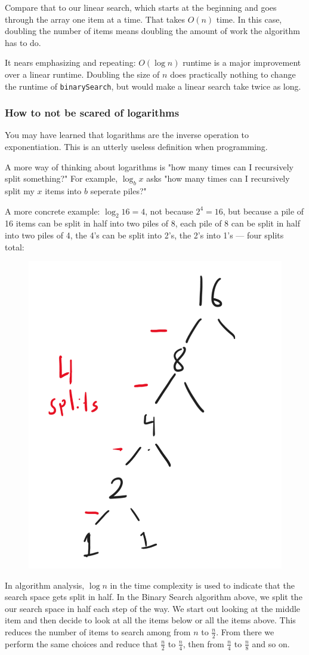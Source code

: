 Compare that to our linear search, which starts at the beginning and goes through the array one item at a time. That takes $O(n)$ time. In this case, doubling the number of items means doubling the amount of work the algorithm has to do.

It nears emphasizing and repeating:  $O(\log n)$ runtime is a major improvement over a linear runtime.  Doubling the size of $n$ does practically nothing to change the runtime of \texttt{binarySearch}, but would make a linear search take twice as long.


\subsubsection{How to not be scared of logarithms}
You may have learned that logarithms are the inverse operation to exponentiation.
This is an utterly useless definition when programming.

A more way of thinking about logarithms is "how many times can I recursively split something?"
For example, $\log_b x$ asks "how many times can I recursively split my $x$ items into $b$ seperate piles?"

A more concrete example: $\log_2 16 = 4$, not because $2^4 = 16$, but because a pile of 16 items can be split in half into two piles of 8, each pile of 8 can be split in half into two piles of 4, the 4's can be split into 2's, the 2's into 1's --- four splits total:

\begin{figure}[h!]
	\centering
	\includegraphics[width=0.4\linewidth]{pics/log16}
	\caption{}
	\label{fig:log16}
\end{figure}



In algorithm analysis, $\log n$ in the time complexity is used to indicate that the search space gets split in half.
In the Binary Search algorithm above, we split the our search space in half each step of the way.  We start out looking at the middle item and then decide to look at all the items below or all the items above.  This reduces the number of items to search among from $n$ to $\frac{n}{2}$.  From there we perform the same choices and reduce that $\frac{n}{2}$ to $\frac{n}{4}$, then from  $\frac{n}{4}$ to  $\frac{n}{8}$ and so on.

